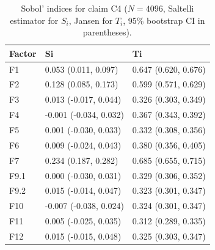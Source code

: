 \begin{table}[ht]
\centering
\caption{Sobol' indices for claim C4 ($N=4096$, Saltelli estimator for $S_i$, Jansen for $T_i$, 95\% bootstrap CI in parentheses).} 
\label{tab:sobol_C4}
\begin{tabular}{lll}
  \hline
Factor & Si & Ti \\ 
  \hline
F1 & 0.053 (0.011, 0.097) & 0.647 (0.620, 0.676) \\ 
  F2 & 0.128 (0.085, 0.173) & 0.599 (0.571, 0.629) \\ 
  F3 & 0.013 (-0.017, 0.044) & 0.326 (0.303, 0.349) \\ 
  F4 & -0.001 (-0.034, 0.032) & 0.367 (0.343, 0.392) \\ 
  F5 & 0.001 (-0.030, 0.033) & 0.332 (0.308, 0.356) \\ 
  F6 & 0.009 (-0.024, 0.043) & 0.380 (0.356, 0.405) \\ 
  F7 & 0.234 (0.187, 0.282) & 0.685 (0.655, 0.715) \\ 
  F9.1 & 0.000 (-0.030, 0.031) & 0.329 (0.306, 0.352) \\ 
  F9.2 & 0.015 (-0.014, 0.047) & 0.323 (0.301, 0.347) \\ 
  F10 & -0.007 (-0.038, 0.024) & 0.324 (0.301, 0.347) \\ 
  F11 & 0.005 (-0.025, 0.035) & 0.312 (0.289, 0.335) \\ 
  F12 & 0.015 (-0.015, 0.048) & 0.325 (0.303, 0.347) \\ 
   \hline
\end{tabular}
\end{table}
